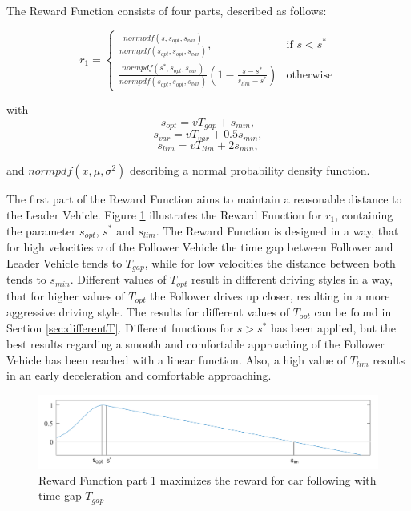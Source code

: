 \documentclass[review]{elsarticle}
\begin{document}
The Reward Function consists of four parts, described as follows:


\begin{equation}
\label{eq:r1}
r_1  = 
\begin{cases}
\frac{normpdf(s,  s_{opt},  s_{var})}{normpdf( s_{opt},  s_{opt},  s_{var})},& \text{if } s < s^*\\
\frac{normpdf(s^*,  s_{opt},  s_{var})}{normpdf( s_{opt},  s_{opt},  s_{var})} (1-\frac{s-s^*}{s_{lim} - s^*})              & \text{otherwise}
\end{cases}
\end{equation}



with
\begin{equation}
\label{eq:r11}
s_{opt} = vT_{gap} + s_{min},
\end{equation}
\begin{equation}
\label{eq:r12}
s_{var} = vT_{var} + 0.5s_{min},
\end{equation}
\begin{equation}
\label{eq:r13}
s_{lim} = vT_{lim} + 2s_{min},
\end{equation}

and $normpdf(x,\mu,\sigma^2)$ describing a normal probability density function.

The first part of the Reward Function aims to maintain a reasonable distance to the Leader Vehicle. Figure \ref{fig:RewardFunc1} illustrates the Reward Function for $r_1$, containing the parameter $s_{opt}$, $s^*$ and $s_{lim}$. The Reward Function is designed in a way, that for high velocities $v$ of the Follower Vehicle the time gap between Follower and Leader Vehicle tends to $T_{gap}$, while for low velocities the distance between both tends to $s_{min}$. Different values of $T_{opt}$ result in different driving styles in a way, that for higher values of $T_{opt}$ the Follower drives up closer, resulting in a more aggressive driving style. The results for different values of $T_{opt}$ can be found in Section \ref{sec:differentT}. Different functions for $ s > s^*$ has been applied, but the best results regarding a smooth and comfortable approaching of the Follower Vehicle has been reached with a linear function. Also, a high value of $T_{lim}$ results in an early deceleration and comfortable approaching. 

\begin{figure}
	\centering
	\includegraphics[width=12cm]{images/RewardFunc1}
	\caption{Reward Function part 1 maximizes the reward for car following with time gap $T_{gap}$}
	\label{fig:RewardFunc1}
\end{figure}
\end{document}
